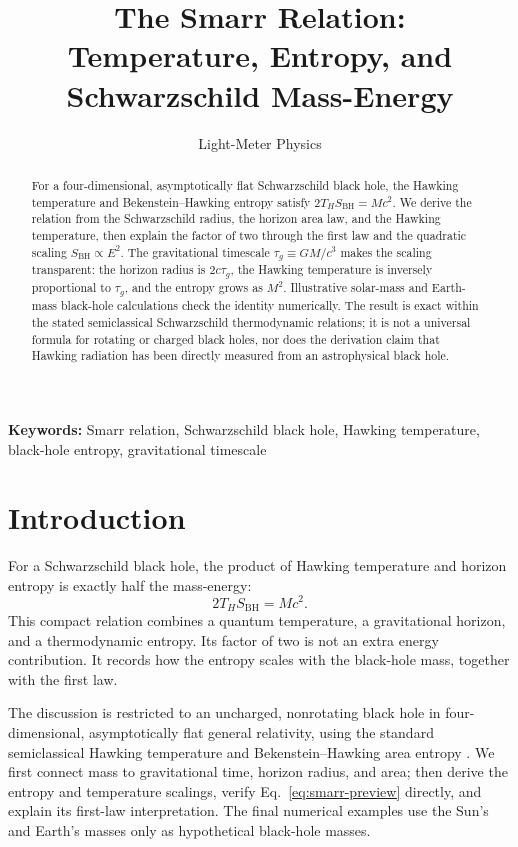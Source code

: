 \documentclass[12pt]{article}
\title{The Smarr Relation:\\
Temperature, Entropy, and Schwarzschild Mass-Energy}
\author{Light-Meter Physics}
\date{}
\begin{document}
\maketitle

\begin{abstract}
For a four-dimensional, asymptotically flat Schwarzschild black hole, the Hawking temperature and Bekenstein--Hawking entropy satisfy $2T_HS_{\mathrm{BH}}=Mc^2$. We derive the relation from the Schwarzschild radius, the horizon area law, and the Hawking temperature, then explain the factor of two through the first law and the quadratic scaling $S_{\mathrm{BH}}\propto E^2$. The gravitational timescale $\tau_g\equiv GM/c^3$ makes the scaling transparent: the horizon radius is $2c\tau_g$, the Hawking temperature is inversely proportional to $\tau_g$, and the entropy grows as $M^2$. Illustrative solar-mass and Earth-mass black-hole calculations check the identity numerically. The result is exact within the stated semiclassical Schwarzschild thermodynamic relations; it is not a universal formula for rotating or charged black holes, nor does the derivation claim that Hawking radiation has been directly measured from an astrophysical black hole.
\end{abstract}

\noindent\textbf{Keywords:} Smarr relation, Schwarzschild black hole, Hawking temperature, black-hole entropy, gravitational timescale

\section{Introduction}

For a Schwarzschild black hole, the product of Hawking temperature and horizon entropy is exactly half the mass-energy:
\begin{equation}
  2T_HS_{\mathrm{BH}}=Mc^2.
  \label{eq:smarr-preview}
\end{equation}
This compact relation combines a quantum temperature, a gravitational horizon, and a thermodynamic entropy. Its factor of two is not an extra energy contribution. It records how the entropy scales with the black-hole mass, together with the first law.

The discussion is restricted to an uncharged, nonrotating black hole in four-dimensional, asymptotically flat general relativity, using the standard semiclassical Hawking temperature and Bekenstein--Hawking area entropy \cite{Bekenstein,Hawking,BardeenCarterHawking,Schwarzschild}. We first connect mass to gravitational time, horizon radius, and area; then derive the entropy and temperature scalings, verify Eq.~\eqref{eq:smarr-preview} directly, and explain its first-law interpretation. The final numerical examples use the Sun's and Earth's masses only as hypothetical black-hole masses.
\end{document}
